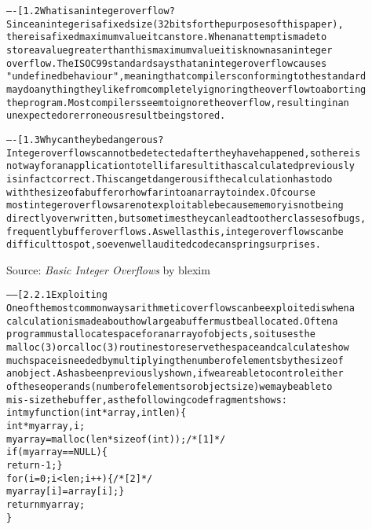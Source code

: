 \documentclass[Screen16to9,17pt]{foils}
\begin{document}



\begin{alltt}\footnotesize
----[ 1.2 What is an integer overflow?
Since an integer is a fixed size (32 bits for the purposes of this paper),
there is a fixed maximum value it can store.  When an attempt is made to
store a value greater than this maximum value it is known as an integer
overflow.  The ISO C99 standard says that an integer overflow causes
"undefined behaviour", meaning that compilers conforming to the standard
may do anything they like from completely ignoring the overflow to aborting
the program.  Most compilers seem to ignore the overflow, resulting in an
unexpected or erroneous result being stored.

----[ 1.3 Why can they be dangerous?
Integer overflows cannot be detected after they have happened, so there is
not way for an application to tell if a result it has calculated previously
is in fact correct.  This can get dangerous if the calculation has to do
with the size of a buffer or how far into an array to index.  Of course
most integer overflows are not exploitable because memory is not being
directly overwritten, but sometimes they can lead to other classes of bugs,
frequently buffer overflows.  As well as this, integer overflows can be
difficult to spot, so even well audited code can spring surprises.
\end{alltt}

Source:
\emph{Basic Integer Overflows} by blexim




\begin{alltt}\footnotesize
------[ 2.2.1 Exploiting
One of the most common ways arithmetic overflows can be exploited is when a
calculation is made about how large a buffer must be allocated.  Often a
program must allocate space for an array of objects, so it uses the
malloc(3) or calloc(3) routines to reserve the space and calculates how
much space is needed by multiplying the number of elements by the size of
an object.  As has been previously shown, if we are able to control either
of these operands (number of elements or object size) we may be able to
mis-size the buffer, as the following code fragment shows:
    int myfunction(int *array, int len)\{
        int *myarray, i;
        myarray = malloc(len * sizeof(int));    /* [1] */
        if(myarray == NULL)\{
            return -1; \}
        for(i = 0; i < len; i++)\{              /* [2] */
            myarray[i] = array[i]; \}
        return myarray;
    \}
  \end{alltt}
\end{document}
